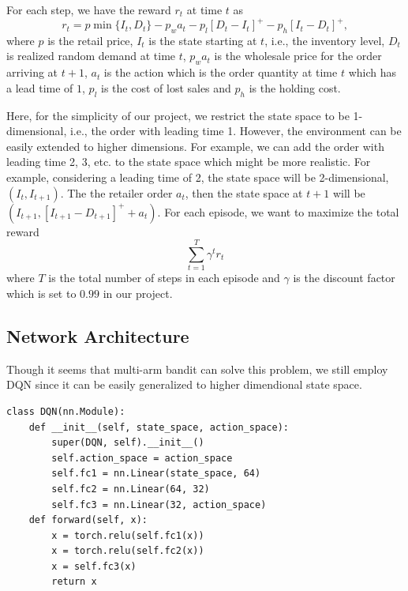 For each step, we have the reward $r_t$ at time $t$ as
\begin{equation}
    r_t = p\min\{I_{t}, D_t\} - p_w a_t - p_l\left[D_t-I_t\right]^+ - p_h\left[I_t-D_t\right]^+,
\end{equation}
where $p$ is the retail price, $I_t$ is the state starting at $t$, i.e., the inventory level, $D_t$ is realized random demand at time $t$, $p_w a_t$ is the wholesale price for the order arriving at $t+1$, $a_t$ is the action which is the order quantity at time $t$ which has a lead time of $1$, $p_l$ is the cost of lost sales and $p_h$ is the holding cost.

Here, for the simplicity of our project, we restrict the state space to be 1-dimensional, i.e., the order with leading time 1. However, the environment can be easily extended to higher dimensions. For example, we can add the order with leading time 2, 3, etc. to the state space which might be more realistic. For example, considering a leading time of 2, the state space will be 2-dimensional, $(I_t,I_{t+1})$. The the retailer order $a_t$, then the state space at $t+1$ will be $(I_{t+1},[I_{t+1}-D_{t+1}]^++a_t)$. For each episode, we want to maximize the total reward
\begin{equation}
    \sum_{t=1}^T \gamma^t r_t
\end{equation}
where $T$ is the total number of steps in each episode and $\gamma$ is the discount factor which is set to $0.99$ in our project.



\subsection{Network Architecture}
Though it seems that multi-arm bandit can solve this problem, we still employ DQN since it can be easily generalized to higher dimendional state space.
\begin{verbatim}
class DQN(nn.Module):
    def __init__(self, state_space, action_space):
        super(DQN, self).__init__()
        self.action_space = action_space
        self.fc1 = nn.Linear(state_space, 64)
        self.fc2 = nn.Linear(64, 32)
        self.fc3 = nn.Linear(32, action_space)
    def forward(self, x):
        x = torch.relu(self.fc1(x))
        x = torch.relu(self.fc2(x))
        x = self.fc3(x)
        return x
\end{verbatim}

